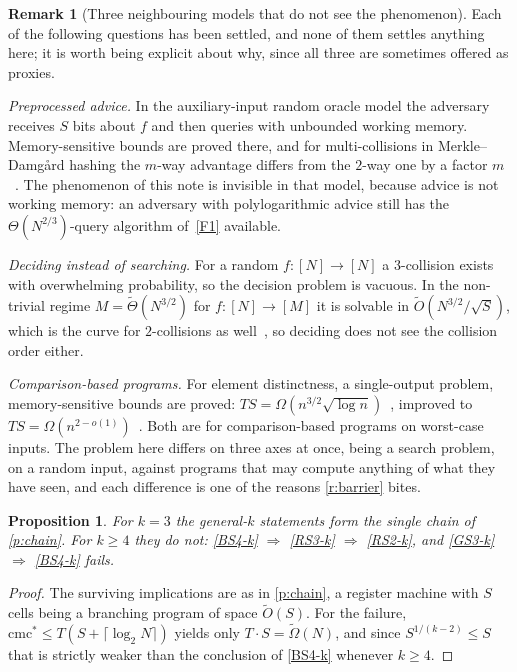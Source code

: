 \documentclass[11pt]{article}
\theoremstyle{plain}
\newtheorem{proposition}{Proposition}
\theoremstyle{definition}
\newtheorem{remark}{Remark}
\newcommand{\NN}{[N]}
\newcommand{\cmcs}{\mathrm{cmc}^{*}}
\begin{document}
\begin{remark}[Three neighbouring models that do not see the phenomenon]\label{r:proxies}
Each of the following questions has been settled, and none of them settles
anything here; it is worth being explicit about why, since all three are
sometimes offered as proxies.

\emph{Preprocessed advice.}  In the auxiliary-input random oracle model the
adversary receives $S$ bits about $f$ and then queries with unbounded
working memory.  Memory-sensitive bounds are proved there, and for
multi-collisions in Merkle--Damg\aa{}rd hashing the $m$-way advantage
differs from the $2$-way one by a factor $m$~\cite{ACDW20,Aks24}.  The
phenomenon of this note is invisible in that model, because advice is not
working memory: an adversary with polylogarithmic advice still has the
$\Theta(N^{2/3})$-query algorithm of~\ref{F1} available.

\emph{Deciding instead of searching.}  For a random $f \colon \NN \to \NN$ a
$3$-collision exists with overwhelming probability, so the decision problem
is vacuous.  In the non-trivial regime $M = \tilde\Theta(N^{3/2})$ for
$f \colon [N] \to [M]$ it is solvable in $\tilde O(N^{3/2}/\sqrt S)$, which
is the curve for $2$-collisions as well~\cite{GNY25}, so deciding does not
see the collision order either.

\emph{Comparison-based programs.}  For element distinctness, a single-output
problem, memory-sensitive bounds are proved: $TS = \Omega(n^{3/2}\sqrt{\log
n})$~\cite{BFMUW87}, improved to $TS = \Omega(n^{2-o(1)})$~\cite{Yao94}.
Both are for comparison-based programs on worst-case inputs.  The problem
here differs on three axes at once, being a search problem, on a random
input, against programs that may compute anything of what they have seen,
and each difference is one of the reasons \cref{r:barrier} bites.
\end{remark}
\begin{proposition}\label{p:fork}
For $k = 3$ the general-$k$ statements form the single chain of
\cref{p:chain}.  For $k \geq 4$ they do not:
\ref{BS4-k} $\Rightarrow$ \ref{RS3-k} $\Rightarrow$ \ref{RS2-k}, and
\ref{GS3-k} $\Rightarrow$ \ref{BS4-k} \emph{fails}.
\end{proposition}

\begin{proof}
The surviving implications are as in \cref{p:chain}, a register machine with
$S$ cells being a branching program of space $\tilde O(S)$.  For the failure,
$\cmcs\leq T(S+\lceil\log_2 N\rceil)$ yields only $T\cdot S=\tilde\Omega(N)$,
and since $S^{1/(k-2)}\leq S$ that is strictly weaker than the conclusion of
\cref{BS4-k} whenever $k\geq4$.
\end{proof}
\end{document}
